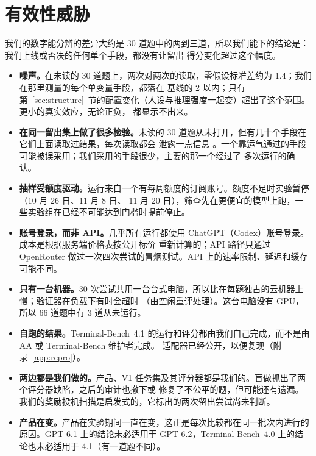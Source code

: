 \section{有效性威胁}
\label{sec:threats}

我们的数字能分辨的差异大约是 30 道题中的两到三道，所以我们能下的结论是：我们上线或否决的任何单个手段，都没有让留出
得分变化超过这个幅度。

\begin{itemize}[leftmargin=1.4em]
  \item \textbf{噪声。}在未读的 30 道题上，两次对两次的读取，零假设标准差约为 1.4；我们在那里测量的每个单变量手段，都落在
    基线的 2 以内；只有第~\ref{sec:structure}~节的配置变化（人设与推理强度一起变）超出了这个范围。更小的真实效应，无论正负，
    都显示不出来。
  \item \textbf{在同一留出集上做了很多检验。}未读的 30 道题从未打开，但有几十个手段在它们上面读取过结果，每次读取都会
    泄露一点信息 \citep{dwork2015reusable}。一个靠运气通过的手段可能被误采用；我们采用的手段很少，主要的那一个经过了
    多次运行的确认。
  \item \textbf{抽样受额度驱动。}运行来自一个有每周额度的订阅账号。额度不足时实验暂停（10 月 26 日、11 月 8 日、
    11 月 20 日），筛查先在更便宜的模型上跑，一些实验组在已经不可能达到门槛时提前停止。
  \item \textbf{账号登录，而非 API。}几乎所有运行都使用 ChatGPT（Codex）账号登录。成本是根据服务端价格表按公开标价
    重新计算的；API 路径只通过 OpenRouter 做过一次四次尝试的冒烟测试。API 上的速率限制、延迟和缓存可能不同。
  \item \textbf{只有一台机器。}30 次尝试共用一台台式电脑，所以比在每题独占的云机器上慢；验证器在负载下有时会超时
    （由空闲重评处理）。这台电脑没有 GPU，所以 66 道题中有 3 道从未运行。
  \item \textbf{自跑的结果。}Terminal-Bench~4.1 的运行和评分都由我们自己完成，而不是由 AA 或 Terminal-Bench 维护者完成。
    适配器已经公开，以便复现（附录~\ref{app:repro}）。
  \item \textbf{两边都是我们做的。}产品、V1 任务集及其评分器都是我们的。盲做抓出了两个评分器缺陷，之后的审计也撤下或
    修复了不公平的题，但可能还有遗漏。我们的奖励投机扫描是启发式的，它标出的两次留出尝试尚未判断。
  \item \textbf{产品在变。}产品在实验期间一直在变，这正是每次比较都在同一批次内进行的原因。GPT-6.1 上的结论未必适用于
    GPT-6.2，Terminal-Bench~4.0 上的结论也未必适用于 4.1（有一道题不同）。
\end{itemize}
